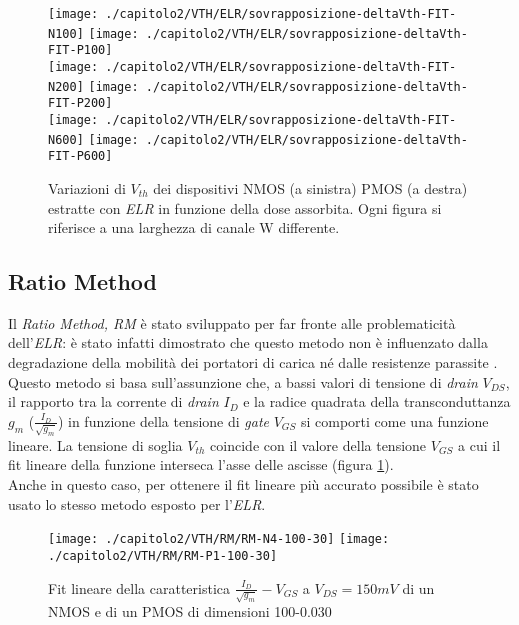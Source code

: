 \clearpage

\begin{figure}[ht]
  \centering
  \texttt{[image: ./capitolo2/VTH/ELR/sovrapposizione-deltaVth-FIT-N100]}
  \texttt{[image: ./capitolo2/VTH/ELR/sovrapposizione-deltaVth-FIT-P100]}\\
  \vspace{0.2cm}
  \texttt{[image: ./capitolo2/VTH/ELR/sovrapposizione-deltaVth-FIT-N200]}
  \texttt{[image: ./capitolo2/VTH/ELR/sovrapposizione-deltaVth-FIT-P200]}\\
  \vspace{0.2cm}
  \texttt{[image: ./capitolo2/VTH/ELR/sovrapposizione-deltaVth-FIT-N600]}
  \texttt{[image: ./capitolo2/VTH/ELR/sovrapposizione-deltaVth-FIT-P600]}
  \caption[Dati $\Delta V_{th}$ estratti con ELR]{Variazioni di $V_{th}$ dei dispositivi NMOS (a sinistra) PMOS (a destra) estratte con \emph{ELR} in funzione della dose assorbita. Ogni figura si riferisce a una larghezza di canale W differente.}
\end{figure}

\FloatBarrier

\subsection[RM]{Ratio Method}
Il \emph{Ratio Method, RM} è stato sviluppato per far fronte alle problematicità dell'\emph{ELR}: è stato infatti dimostrato che questo metodo non è influenzato dalla degradazione della mobilità dei portatori di carica né dalle resistenze parassite \cite{art2}. Questo metodo si basa sull'assunzione che, a bassi valori di tensione di \emph{drain} $V_{DS}$, il rapporto tra la corrente di \emph{drain} $I_D$ e la radice quadrata della transconduttanza $g_m$ ($\frac{I_D}{\sqrt{g_m}}$) in funzione della tensione di \emph{gate} $V_{GS}$ si comporti come una funzione lineare. La tensione di soglia $V_{th}$ coincide con il valore della tensione $V_{GS}$ a cui il fit lineare della funzione interseca l'asse delle ascisse (figura \ref{fig:FIT_RM}).\\
Anche in questo caso, per ottenere il fit lineare più accurato possibile è stato usato lo stesso metodo esposto per l'\emph{ELR}.

\vspace{1.5cm}

\begin{figure}[h!]
  \centering
  \texttt{[image: ./capitolo2/VTH/RM/RM-N4-100-30]}
  \texttt{[image: ./capitolo2/VTH/RM/RM-P1-100-30]}
  \caption[Applicazione RM]{Fit lineare della caratteristica $\frac{I_D}{\sqrt{g_m}}-V_{GS}$ a $V_{DS}=150mV$ di un NMOS e di un PMOS di dimensioni 100-0.030}
  \label{fig:FIT_RM}
\end{figure}

